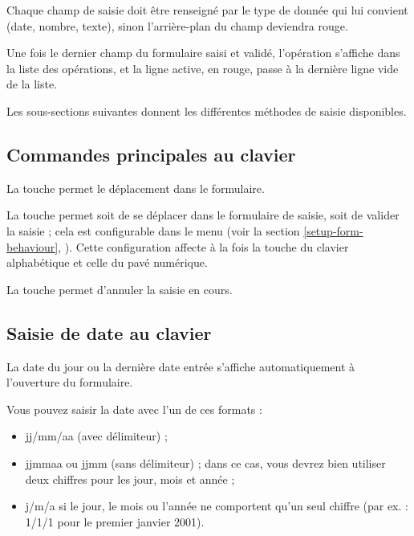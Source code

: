 Chaque champ de saisie doit être renseigné par le type de  donnée qui lui convient (date, nombre, texte), sinon l'arrière-plan du champ deviendra rouge{\couleur}. 

Une fois le dernier champ du formulaire saisi et validé, l'opération s'affiche dans la liste des opérations, et la ligne active, en rouge{\couleur}, passe à la dernière ligne vide de la liste.

Les sous-sections suivantes donnent les différentes méthodes de saisie disponibles.


\subsection{Commandes principales au clavier\label{transactions-new-keyboard}}

La touche  permet le déplacement dans le formulaire.

La touche  permet soit de se déplacer dans le formulaire de saisie, soit de valider la saisie ; cela est configurable dans le menu  (voir la section \vref{setup-form-behaviour}, ). Cette  configuration affecte à la fois la touche  du clavier alphabétique et celle du pavé numérique.

La touche  permet d'annuler la saisie en cours.


\subsection{Saisie de date au clavier\label{transactions-new-dates}}

La date du jour ou la dernière date entrée s'affiche automatiquement à l'ouverture du formulaire.

Vous pouvez saisir la date avec l'un de ces formats :

\begin{itemize}
	 \item jj/mm/aa (avec délimiteur) ;
	 \item jjmmaa ou jjmm (sans délimiteur) ; dans ce cas, vous devrez bien utiliser deux chiffres pour les jour, mois et année ;
	 \item j/m/a si le jour, le mois ou l'année ne comportent qu'un seul chiffre (par ex. : 1/1/1 pour le premier janvier 2001).
\end{itemize}

